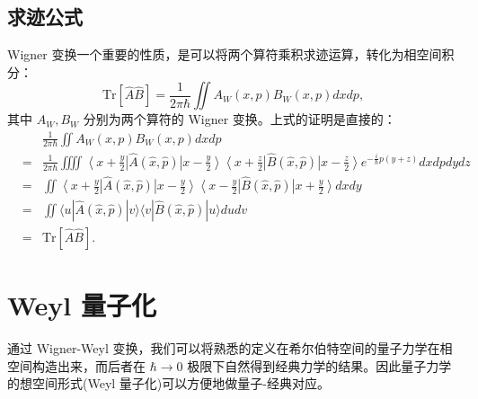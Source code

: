 \documentclass[10pt,UTF8]{ctexart}
\begin{document}
\subsection*{求迹公式}
\noindent
Wigner 变换一个重要的性质，是可以将两个算符乘积求迹运算，转化为相空间积分：
\begin{equation}
	\mathrm{Tr}[\hat A \hat B]=\frac{1}{2\pi\hbar}\iint A_W(x,p)B_W(x,p)dxdp,
\end{equation}
其中 $A_W,B_W$ 分别为两个算符的 Wigner 变换。上式的证明是直接的：
\begin{eqnarray}
	&& \frac{1}{2\pi\hbar}\iint A_W(x,p)B_W(x,p)dxdp \nonumber \\
	&=& \frac{1}{2\pi\hbar}\iiiint \left\langle x+\frac{y}{2}\right|\hat A(\hat x,\hat p) \left|x-\frac{y}{2}\right\rangle\left\langle x+\frac{z}{2}\right|\hat B(\hat x,\hat p) \left|x-\frac{z}{2}\right\rangle e^{-\frac{i}{\hbar}p(y+z)} dxdpdydz \nonumber \\
	&=& \iint \left\langle x+\frac{y}{2}\right|\hat A(\hat x,\hat p) \left|x-\frac{y}{2}\right\rangle\left\langle x-\frac{y}{2}\right|\hat B(\hat x,\hat p) \left|x+\frac{y}{2}\right\rangle dxdy \nonumber \\
	&=& \iint \langle u|\hat A(\hat x,\hat p) |v\rangle \langle v|\hat B(\hat x,\hat p) |u\rangle dudv \nonumber \\
	&=& \mathrm{Tr}[\hat A \hat B].
\end{eqnarray}


\section*{Weyl 量子化}
\noindent
通过 Wigner-Weyl 变换，我们可以将熟悉的定义在希尔伯特空间的量子力学在相空间构造出来，而后者在 $\hbar \rightarrow 0$ 极限下自然得到经典力学的结果。因此量子力学的想空间形式(Weyl 量子化)可以方便地做量子-经典对应。
\end{document}
